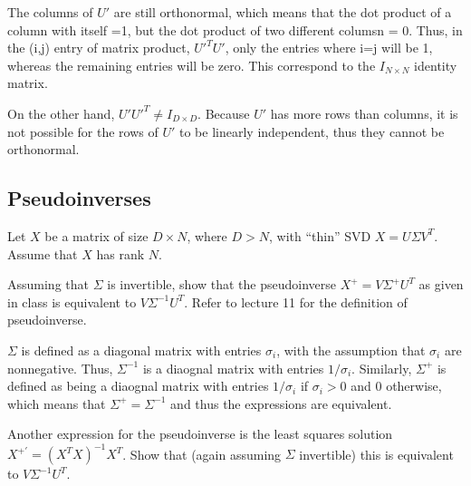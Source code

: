 \begin{solution}
	The columns of $U'$ are still orthonormal, which means that the dot product of a column with itself =1, but the dot product of two different columsn = 0. Thus, in the (i,j) entry of matrix product, $U'^TU'$, only the entries where i=j will be 1, whereas the remaining entries will be zero. This correspond to the $I_{N \times N}$ identity matrix. \newline
	
	On the other hand, $U'U'^T \neq I_{D \times D}$. Because $U'$ has more rows than columns, it is not possible for the rows of $U'$ to be linearly independent, thus they cannot be orthonormal.
\end{solution}

\subsection{Pseudoinverses} Let $X$ be a matrix of size $D \times N$, where $D > N$, with ``thin'' SVD $X = U\Sigma V^T$. Assume that $X$ has rank $N$.

\problem[4] Assuming that $\Sigma$ is invertible, show that the pseudoinverse $X^+ = V\Sigma^+ U^T$ as given in class is equivalent to $V\Sigma^{-1} U^T$. Refer to lecture 11 for the definition of pseudoinverse.

\begin{solution}
	$\Sigma$ is defined as a diagonal matrix with entries $\sigma_i$, with the assumption that $\sigma_i$ are nonnegative. Thus, $\Sigma ^ {-1}$ is a diaognal matrix with entries $1/\sigma_i$. Similarly, $\Sigma ^ +$ is defined as being a diaognal matrix with entries $1/\sigma_i$ if $\sigma_i > 0$ and 0 otherwise, which means that  $\Sigma ^+ = \Sigma ^ {-1}$ and thus the expressions are equivalent.

\end{solution}

\problem[4] Another expression for the pseudoinverse is the least squares solution $X^{+'} = (X^T X)^{-1}X^T$. Show that (again assuming $\Sigma$ invertible) this is equivalent to $V\Sigma^{-1}U^T$.

